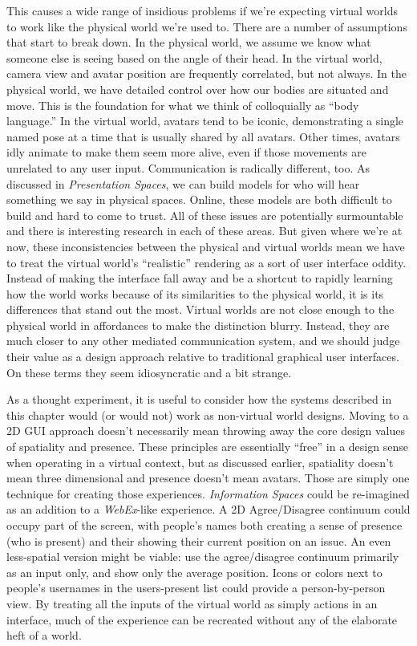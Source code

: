 This causes a wide range of insidious problems if we're expecting virtual worlds to work like the physical world we're used to. There are a number of assumptions that start to break down. In the physical world, we assume we know what someone else is seeing based on the angle of their head. In the virtual world, camera view and avatar position are frequently correlated, but not always. In the physical world, we have detailed control over how our bodies are situated and move. This is the foundation for what we think of colloquially as ``body language.'' In the virtual world, avatars tend to be iconic, demonstrating a single named pose at a time that is usually shared by all avatars. Other times, avatars idly animate to make them seem more alive, even if those movements are unrelated to any user input. Communication is radically different, too. As discussed in \emph{Presentation Spaces}, we can build models for who will hear something we say in physical spaces. Online, these models are both difficult to build and hard to come to trust. All of these issues are potentially surmountable and there is interesting research in each of these areas. But given where we're at now, these inconsistencies between the physical and virtual worlds mean we have to treat the virtual world's ``realistic'' rendering as a sort of user interface oddity. Instead of making the interface fall away and be a shortcut to rapidly learning how the world works because of its similarities to the physical world, it is its differences that stand out the most. Virtual worlds are not close enough to the physical world in affordances to make the distinction blurry. Instead, they are much closer to any other mediated communication system, and we should judge their value as a design approach relative to traditional graphical user interfaces. On these terms they seem idiosyncratic and a bit strange.

As a thought experiment, it is useful to consider how the systems described in this chapter would (or would not) work as non-virtual world designs. Moving to a 2D GUI approach doesn't necessarily mean throwing away the core design values of spatiality and presence. These principles are essentially ``free'' in a design sense when operating in a virtual context, but as discussed earlier, spatiality doesn't mean three dimensional and presence doesn't mean avatars. Those are simply one technique for creating those experiences. \emph{Information Spaces} could be re-imagined as an addition to a \emph{WebEx}-like experience. A 2D Agree/Disagree continuum could occupy part of the screen, with people's names both creating a sense of presence (who is present) and their showing their current position on an issue. An even less-spatial version might be viable: use the agree/disagree continuum primarily as an input only, and show only the average position. Icons or colors next to people's usernames in the users-present list could provide a person-by-person view. By treating all the inputs of the virtual world as simply actions in an interface, much of the experience can be recreated without any of the elaborate heft of a world.

